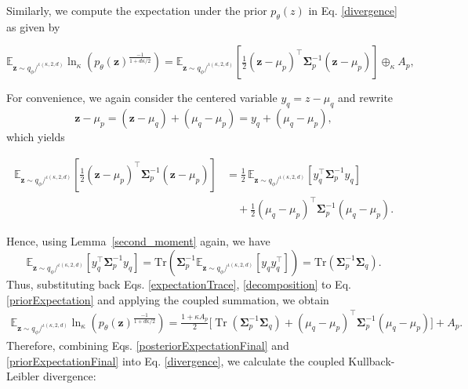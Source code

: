 \documentclass[twoside,11pt]{article}
\renewenvironment{proof}{\par\noindent{\bf Proof\ }}{\hfill\BlackBox\par\vspace{2mm}}
\begin{document}
\begin{proof}
Similarly, we compute the expectation under the prior $p_{\theta}(z)$ in Eq. \eqref{divergence} as given by

\begin{equation} \label{priorExpectation}
\mathbb{E}_{\mathbf{z} \sim q_\phi/^{\iota(\kappa,2,d)}}
\ln_{\kappa}\!\left(p_\theta(\mathbf{z})^{\frac{-1}{1+d\kappa/2}}\right) = \mathbb{E}_{\mathbf{z} \sim q_\phi/^{\iota(\kappa,2,d)}} \left[
\tfrac{1}{2}(\mathbf{z}-\mu_p)^\intercal\boldsymbol{\Sigma}_p^{-1}(\mathbf{z}-\mu_p)
\right] \oplus_{\kappa} A_p,
\end{equation}

For convenience, we again consider the centered variable $y_q = z - \mu_q$ and rewrite
\[
\mathbf{z}-\mu_p = (\mathbf{z}-\mu_q)+(\mu_q-\mu_p) = y_q +(\mu_q-\mu_p),
\]
which yields

\begin{equation} \label{decomposition}
\begin{split}
\mathbb{E}_{\mathbf{z} \sim q_\phi/^{\iota(\kappa,2,d)}} \left[ \tfrac{1}{2}(\mathbf{z}-\mu_p)^\intercal\boldsymbol{\Sigma}_p^{-1}(\mathbf{z}-\mu_p) \right] &= \frac{1}{2}\,\mathbb{E}_{\mathbf{z} \sim q_\phi/^{\iota(\kappa,2,d)}}\left[y_q^\intercal \boldsymbol{\Sigma}_p^{-1} y_q \right] \\
&\quad + \tfrac{1}{2}(\mu_q-\mu_p)^\intercal \boldsymbol{\Sigma}_p^{-1}(\mu_q-\mu_p).
\end{split}
\end{equation}

\noindent
Hence, using Lemma~\ref{second_moment} again, we have
\begin{equation} \label{expectationTrace}
    \mathbb{E}_{\mathbf{z} \sim q_\phi/^{\iota(\kappa,2,d)}}\left[y_q^\intercal \boldsymbol{\Sigma}_p^{-1} y_q \right]  =  \text{Tr}\left(\boldsymbol{\Sigma}_p^{-1} \mathbb{E}_{\mathbf{z} \sim q_\phi/^{\iota(\kappa,2,d)}} [y_q y_q^\intercal]  \right )  = \text{Tr}\left (\boldsymbol{\Sigma}_p^{-1}\boldsymbol{\Sigma}_q\right).
\end{equation}
Thus, substituting back Eqs. \eqref{expectationTrace}, \eqref{decomposition} to Eq. \eqref{priorExpectation} and applying the coupled summation, we obtain
\begin{equation} \label{priorExpectationFinal}
\begin{split}
     \mathbb{E}_{\mathbf{z} \sim q_\phi/^{\iota(\kappa,2,d)}}
\ln_{\kappa}\!\left(p_\theta(\mathbf{z})^{\frac{-1}{1+d\kappa/2}}\right) = 
\frac{1+\kappa A_p}{2}
\Big[
\operatorname{Tr}(\boldsymbol{\Sigma}_p^{-1}\boldsymbol{\Sigma}_q)
+
(\mu_q-\mu_p)^\intercal\boldsymbol{\Sigma}_p^{-1}(\mu_q-\mu_p)
\Big]
+
A_p.
\end{split}
\end{equation}
Therefore, combining Eqs. \eqref{posteriorExpectationFinal} and \eqref{priorExpectationFinal} into Eq. \eqref{divergence}, we calculate the coupled  Kullback-Leibler divergence:


\end{proof}
\end{document}
